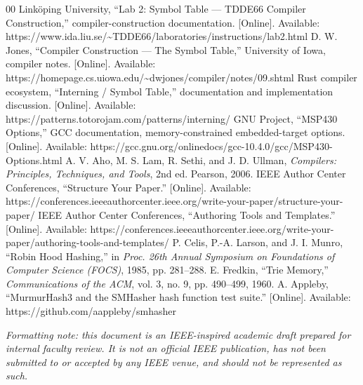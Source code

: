 \documentclass[conference]{IEEEtran}
\begin{document}
\begin{thebibliography}{00}
 Link\"oping University, ``Lab 2: Symbol Table --- TDDE66
  Compiler Construction,'' compiler-construction documentation. [Online].
  Available: https://www.ida.liu.se/\textasciitilde{}TDDE66/laboratories/instructions/lab2.html
 D. W. Jones, ``Compiler Construction --- The Symbol
  Table,'' University of Iowa, compiler notes. [Online]. Available:
  https://homepage.cs.uiowa.edu/\textasciitilde{}dwjones/compiler/notes/09.shtml
 Rust compiler ecosystem, ``Interning / Symbol
  Table,'' documentation and implementation discussion. [Online]. Available:
  https://patterns.totorojam.com/patterns/interning/
 GNU Project, ``MSP430 Options,'' GCC documentation,
  memory-constrained embedded-target options. [Online]. Available:
  https://gcc.gnu.org/onlinedocs/gcc-10.4.0/gcc/MSP430-Options.html
 A. V. Aho, M. S. Lam, R. Sethi, and J. D. Ullman,
  \emph{Compilers: Principles, Techniques, and Tools}, 2nd ed. Pearson, 2006.
 IEEE Author Center Conferences, ``Structure Your
  Paper.'' [Online]. Available:
  https://conferences.ieeeauthorcenter.ieee.org/write-your-paper/structure-your-paper/
 IEEE Author Center Conferences, ``Authoring Tools and
  Templates.'' [Online]. Available:
  https://conferences.ieeeauthorcenter.ieee.org/write-your-paper/authoring-tools-and-templates/
 P. Celis, P.-A. Larson, and J. I. Munro, ``Robin
  Hood Hashing,'' in \emph{Proc. 26th Annual Symposium on Foundations of
  Computer Science (FOCS)}, 1985, pp. 281--288.
 E. Fredkin, ``Trie Memory,'' \emph{Communications of
  the ACM}, vol. 3, no. 9, pp. 490--499, 1960.
 A. Appleby, ``MurmurHash3 and the SMHasher hash
  function test suite.'' [Online]. Available:
  https://github.com/aappleby/smhasher
\end{thebibliography}

\vspace{1em}
\noindent\textit{Formatting note: this document is an IEEE-inspired academic
draft prepared for internal faculty review. It is not an official IEEE
publication, has not been submitted to or accepted by any IEEE venue, and
should not be represented as such.}
\end{document}
